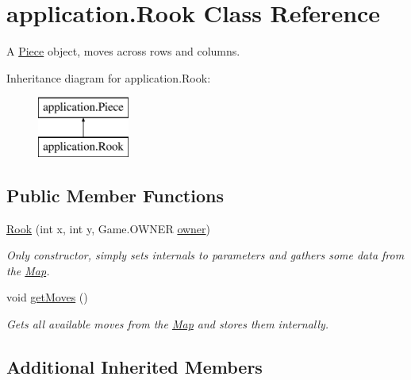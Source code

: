 \hypertarget{classapplication_1_1_rook}{\section{application.\+Rook Class Reference}
\label{classapplication_1_1_rook}
}


A \hyperlink{classapplication_1_1_piece}{Piece} object, moves across rows and columns.  


Inheritance diagram for application.\+Rook\+:\begin{figure}[H]
\begin{center}
\leavevmode
\includegraphics[height=2.000000cm]{classapplication_1_1_rook}
\end{center}
\end{figure}
\subsection*{Public Member Functions}
\begin{DoxyCompactItemize}
\item 
\hyperlink{classapplication_1_1_rook_a748877f5e1bfca7a705a19b1832c5629}{Rook} (int x, int y, Game.\+O\+W\+N\+E\+R \hyperlink{classapplication_1_1_piece_a724f116bd99a66a6f6bcc8b7b35de131}{owner})
\begin{DoxyCompactList}\small\item\em Only constructor, simply sets internals to parameters and gathers some data from the \hyperlink{classapplication_1_1_map}{Map}. \end{DoxyCompactList}\item 
\hypertarget{classapplication_1_1_rook_a3a2f760f2cc7d5ee583df33b3b11ccd0}{void \hyperlink{classapplication_1_1_rook_a3a2f760f2cc7d5ee583df33b3b11ccd0}{get\+Moves} ()}\label{classapplication_1_1_rook_a3a2f760f2cc7d5ee583df33b3b11ccd0}

\begin{DoxyCompactList}\small\item\em Gets all available moves from the \hyperlink{classapplication_1_1_map}{Map} and stores them internally. \end{DoxyCompactList}\end{DoxyCompactItemize}
\subsection*{Additional Inherited Members}



